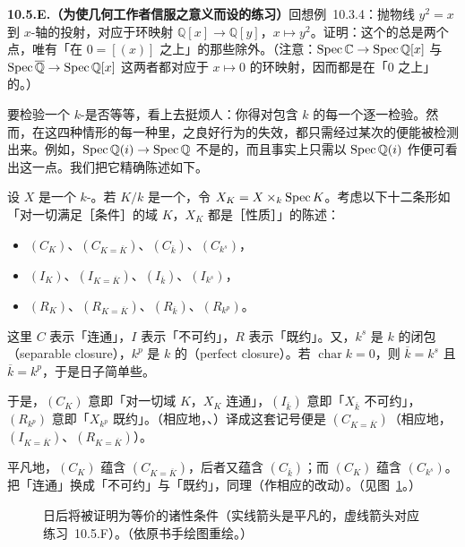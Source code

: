 \textbf{10.5.E.（为使几何工作者信服\trGeometricFiber{}之意义而设的练习）}\quad 回想例~10.3.4：抛物线 $y^2=x$ 到 $x$-轴的投射，对应于环映射 $\mathbb{Q}[x]\to\mathbb{Q}[y]$，$x\mapsto y^2$。证明：这个\trMap{}的\trGeometricFiber{}总是两个点，唯有「在 $0=[(x)]$ 之上」的那些\trGeometricFiber{}除外。（注意：$\operatorname{Spec}\mathbb{C}\to\operatorname{Spec}\mathbb{Q}[x]$ 与 $\operatorname{Spec}\overline{\mathbb{Q}}\to\operatorname{Spec}\mathbb{Q}[x]$ 这两者都对应于 $x\mapsto 0$ 的环映射，因而都是在「$0$ 之上」的\trGeometricPoint{}。）

要检验一个 $k$-\trScheme{}是否\trGeometricallyConnected{}等等，看上去挺烦人：你得对包含 $k$ 的每一个\trAlgClosedField{}逐一检验。然而，在这四种情形的每一种里，\trGeometricFiber{}之良好行为的失效，都只需经过某次\trFinite{}的\trFieldExtension{}便能被检测出来。例如，$\operatorname{Spec}\mathbb{Q}(i)\to\operatorname{Spec}\mathbb{Q}$ 不是\trGeometricallyConnected{}的，而且事实上只需以 $\operatorname{Spec}\mathbb{Q}(i)$ 作\trBaseChange{}便可看出这一点。我们把它精确陈述如下。

设 $X$ 是一个 $k$-\trScheme。若 $K/k$ 是一个\trFieldExtension，令 $X_K=X\times_k\operatorname{Spec} K$。考虑以下十二条形如「对一切满足［条件］的域 $K$，$X_K$ 都是［性质］」的陈述：
\begin{itemize}
  \item $(C_K)$、$(C_{K=\overline{K}})$、$(C_{\overline{k}})$、$(C_{k^s})$，
  \item $(I_K)$、$(I_{K=\overline{K}})$、$(I_{\overline{k}})$、$(I_{k^s})$，
  \item $(R_K)$、$(R_{K=\overline{K}})$、$(R_{\overline{k}})$、$(R_{k^p})$。
\end{itemize}
这里 $C$ 表示「连通」，$I$ 表示「不可约」，$R$ 表示「既约」。又，$k^s$ 是 $k$ 的\trSeparablyClosed{}闭包（separable closure），$k^p$ 是 $k$ 的\trPerfectClosure{}（perfect closure）。若 $\operatorname{char}k=0$，则 $\overline{k}=k^s$ 且 $\overline{k}=k^p$，于是日子简单些。

于是，$(C_K)$ 意即「对一切域 $K$，$X_K$ 连通」，$(I_{\overline{k}})$ 意即「$X_{\overline{k}}$ 不可约」，$(R_{k^p})$ 意即「$X_{k^p}$ 既约」。\trGeometricallyConnected{}（相应地，\trGeometricallyIrreducible{}、\trGeometricallyReduced{}）译成这套记号便是 $(C_{K=\overline{K}})$（相应地，$(I_{K=\overline{K}})$、$(R_{K=\overline{K}})$）。

平凡地，$(C_K)$ 蕴含 $(C_{K=\overline{K}})$，后者又蕴含 $(C_{\overline{k}})$；而 $(C_K)$ 蕴含 $(C_{k^s})$。把「连通」换成「不可约」与「既约」，同理（作相应的改动）。（见图~\ref{fig:connectedness-conditions}。）

\begin{figure}[htbp]
\centering
{}
\caption{日后将被证明为等价的诸\trConnected{}性条件（实线箭头是平凡的，虚线箭头对应\mbox{练习~10.5.F}）。（依原书手绘图重绘。）}%
\label{fig:connectedness-conditions}
\end{figure}


